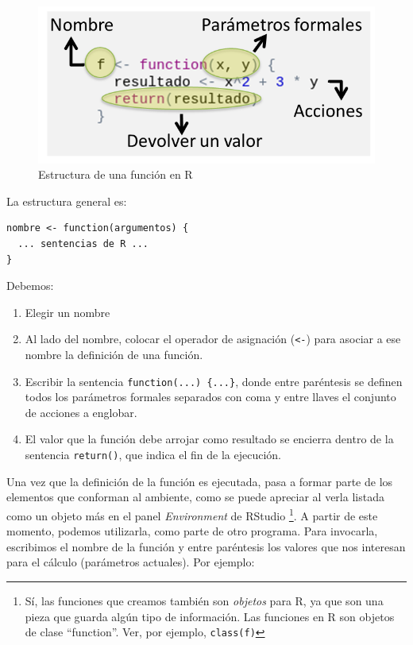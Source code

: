 \documentclass[
]{book}
\providecommand{\tightlist}{%
  \setlength{\itemsep}{0pt}\setlength{\parskip}{0pt}}
\begin{document}
\begin{figure}

{\centering \includegraphics[width=0.8\linewidth]{images/03_funciones/31} 

}

\caption{Estructura de una función en R}\label{fig:unnamed-chunk-79}
\end{figure}

La estructura general es:

\begin{verbatim}
nombre <- function(argumentos) {
  ... sentencias de R ...
}
\end{verbatim}

Debemos:

\begin{enumerate}
\def\labelenumi{\arabic{enumi}.}
\tightlist
\item
  Elegir un nombre
\item
  Al lado del nombre, colocar el operador de asignación (\texttt{\textless{}-}) para asociar a ese nombre la definición de una función.
\item
  Escribir la sentencia \texttt{function(...)\ \{...\}}, donde entre paréntesis se definen todos los parámetros formales separados con coma y entre llaves el conjunto de acciones a englobar.
\item
  El valor que la función debe arrojar como resultado se encierra dentro de la sentencia \texttt{return()}, que indica el fin de la ejecución.
\end{enumerate}

Una vez que la definición de la función es ejecutada, pasa a formar parte de los elementos que conforman al ambiente, como se puede apreciar al verla listada como un objeto más en el panel \emph{Environment} de RStudio \footnote{Sí, las funciones que creamos también son \emph{objetos} para R, ya que son una pieza que guarda algún tipo de información. Las funciones en R son objetos de clase ``function''. Ver, por ejemplo, \texttt{class(f)}}. A partir de este momento, podemos utilizarla, como parte de otro programa. Para invocarla, escribimos el nombre de la función y entre paréntesis los valores que nos interesan para el cálculo (parámetros actuales). Por ejemplo:
\end{document}
